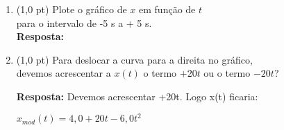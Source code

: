 \documentclass[12pt,a4paper,oneside]{article}
\begin{document}
\begin{enumerate}
\begin{enumerate}
{			(i) O instante positivo em que a partícula passa pela origem é aproximadamente 0,82 s (ver justificativa na letra (c)).		
		}
		\item (1,0 pt) Plote o gráfico de $x$ em função de $t$ \\
		para o intervalo de -5 s a + 5 s.\\
		{ \color{blue}
			{\bf Resposta:}}
			\begin{center}
			\end{center}
		\item (1,0 pt) Para deslocar a curva para a direita no gráfico,\\ devemos acrescentar a $x(t)$ o termo $+20t$ ou o termo $-20t$?\\
		{ \color{blue}
			{\bf Resposta:} Devemos acrescentar +20t. Logo x(t) ficaria: \\
			\begin{center}
				$x_{mod}(t) = 4,0 + 20t - 6,0t^2$
			\end{center}
		}
		\begin{center}
		\end{center}
		\newpage
		

\end{enumerate}
\end{enumerate}
\end{document}
